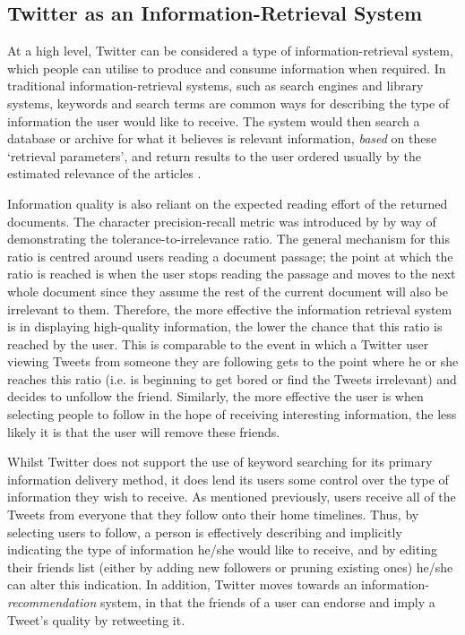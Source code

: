 \subsection{Twitter as an Information-Retrieval System}
At a high level, Twitter can be considered a type of information-retrieval system, which people can utilise to produce and consume information when required. In traditional information-retrieval systems, such as search engines and library systems, keywords and search terms are common ways for describing the type of information the user would like to receive. The system would then search a database or archive for what it believes is relevant information, \textit{based} on these `retrieval parameters', and return results to the user ordered usually by the estimated relevance of the articles \cite{arvola10}.

Information quality is also reliant on the expected reading effort of the returned documents. The character precision-recall metric was introduced by \citet{arvola10} by way of demonstrating the tolerance-to-irrelevance ratio. The general mechanism for this ratio is centred around users reading a document passage; the point at which the ratio is reached is when the user stops reading the passage and moves to the next whole document since they assume the rest of the current document will also be irrelevant to them. Therefore, the more effective the information retrieval system is in displaying high-quality information, the lower the chance that this ratio is reached by the user. This is comparable to the event in which a Twitter user viewing Tweets from someone they are following gets to the point where he or she reaches this ratio (i.e. is beginning to get bored or find the Tweets irrelevant) and decides to unfollow the friend. Similarly, the more effective the user is when selecting people to follow in the hope of receiving interesting information, the less likely it is that the user will remove these friends.

Whilst Twitter does not support the use of keyword searching for its primary information delivery method, it does lend its users some control over the type of information they wish to receive. As mentioned previously, users receive all of the Tweets from everyone that they follow onto their home timelines. Thus, by selecting users to follow, a person is effectively describing and implicitly indicating the type of information he/she would like to receive, and by editing their friends list (either by adding new followers or pruning existing ones) he/she can alter this indication. In addition, Twitter moves towards an information-\textit{recommendation} system, in that the friends of a user can endorse and imply a Tweet's quality by retweeting it.

